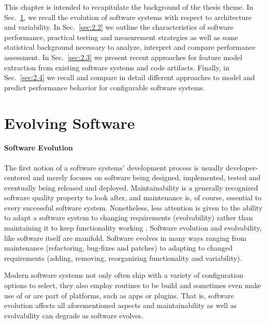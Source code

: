This chapter is intended to recapitulate the background of the thesis theme. In
Sec.~\ref{sec:2.1}, we recall the evolution of software systems with respect to
architecture and variability. In Sec.~\ref{sec:2.2} we outline the characteristics
of software performance, practical testing and measurement strategies as well as
some statistical background necessary to analyze, interpret and compare
performance assessment. In Sec.~\ref{sec:2.3} we present recent approaches for
feature model extraction from existing software systems and code artifacts. Finally, in
Sec.~\ref{sec:2.4} we recall and compare in detail different approaches to model
and predict performance behavior for configurable software systems.

\section{Evolving Software} \label{sec:2.1}
\paragraph{Software Evolution}
The first notion of a software systems' development process is usually
developer-centered and merely focuses on software being designed, implemented,
tested and eventually being released and deployed. Maintainability is a
generally recognized software quality property to look after, and maintenance
is, of course, essential to every successful software system. Nonetheless, less
attention is given to the ability to adapt a software system to changing
requirements (evolvability) rather than maintaining it to keep functionality
working \citep{parnas_software_1994}. Software evolution and evolvability, like
software itself are manifold. Software evolves in many ways ranging from maintenance (refactoring,
bug-fixes and patches) to adapting to changed requirements (adding, removing,
reorganizing functionality and variability).

Modern software systems not only often ship with a variety of configuration
options to select, they also employ routines to be build and sometimes even
make use of or are part of platforms, such as apps or plugins. That is,
software evolution affects all aforementioned aspects and maintainability as
well as evolvability can degrade as software evolves.


